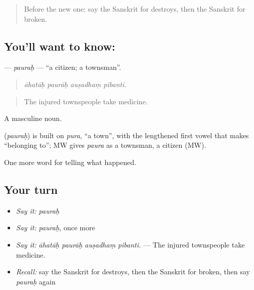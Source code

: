 \label{lesson:SA-C298-paurah}



\begin{quote}
Before the new one: say the Sanskrit for destroys, then the Sanskrit for broken.
\end{quote}

\subsection*{You'll want to know: }
\textbf{} — \emph{pauraḥ} — \textquotedblleft{}a citizen; a townsman\textquotedblright{}.

\begin{quote}
   
\end{quote}

\begin{quote}
\emph{āhatāḥ paurāḥ auṣadhaṃ pibanti.}
\end{quote}

\begin{quote}
The injured townspeople take medicine.
\end{quote}

A masculine noun.

\begin{cousinweb}
\textbf{} (\emph{pauraḥ}) is built on \emph{pura}, \textquotedblleft{}a town\textquotedblright{}, with the lengthened first vowel that makes \textquotedblleft{}belonging to\textquotedblright{}; MW gives \emph{paura} as a townsman, a citizen (MW).
\end{cousinweb}

\begin{grammarlens}[title={What you've built}]
One more word for telling what happened.
\end{grammarlens}

\subsection*{Your turn}
\begin{itemize}
\raggedright
  \item \emph{Say it:} \emph{pauraḥ}
  \item \emph{Say it:} \emph{pauraḥ}, once more
  \item \emph{Say it:} \emph{āhatāḥ paurāḥ auṣadhaṃ pibanti.} — The injured townspeople take medicine.
  \item \emph{Recall:} say the Sanskrit for destroys, then the Sanskrit for broken, then say \emph{pauraḥ} again
\end{itemize}

